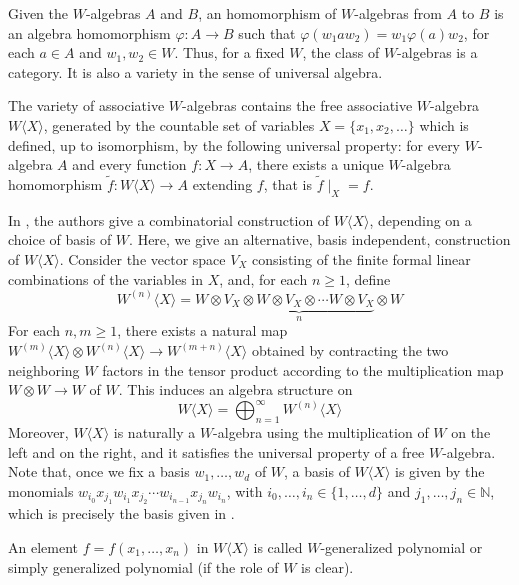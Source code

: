 \documentclass{article}
\newcommand{\WX}{W\langle X\rangle}
\begin{document}
Given the $W$-algebras $A$ and $B$, an homomorphism of $W$-algebras from $A$ to $B$ is an algebra homomorphism $\varphi:A\rightarrow B$ such that $\varphi(w_1aw_2)=w_1\varphi(a)w_2$, for each $a\in A$ and $w_1,w_2\in W$. Thus, for a fixed $W$, the class of $W$-algebras is a category. It is also a variety in the sense of universal algebra. 

The variety of associative $W$-algebras contains the free associative $W$-algebra $\WX$, generated by the countable set of variables $X=\{x_1,x_2,\dots\}$ which is defined, up to isomorphism, by the following universal property: for every $W$-algebra $A$ and every function $f:X\rightarrow A$, there exists a unique $W$-algebra homomorphism $\tilde{f}: \WX \rightarrow A$ extending $f$, that is $\tilde{f}\mid_X = f$.

In \cite{MR25a}, the authors give a combinatorial construction of $\WX$, depending on a choice of basis of $W$. Here, we give an alternative, basis independent, construction of $\WX$. Consider the vector space $V_X$ consisting of the finite formal linear combinations of the variables in $X$, and, for each $n\geq 1$, define \begin{equation}\label{eq: W^n}
	W^{(n)}\langle X\rangle = W\otimes \underbrace{V_X\otimes W \otimes V_X \otimes \cdots W \otimes V_X}_n \otimes W 
\end{equation}
For each $n,m\geq1$, there exists a natural map $W^{(m)}\langle X\rangle\otimes W^{(n)}\langle X\rangle \rightarrow W^{(m+n)}\langle X\rangle$ obtained by contracting the two neighboring $W$ factors in the tensor product according to the multiplication map $W\otimes W\rightarrow W$ of $W$. This induces an algebra structure on \begin{equation}\label{eq: WX}
	W\langle X\rangle = \bigoplus_{n=1}^\infty W^{(n)}\langle X\rangle
\end{equation}
Moreover, $W\langle X \rangle$ is naturally a $W$-algebra using the multiplication of $W$ on the left and on the right, and it satisfies the universal property of a free $W$-algebra. Note that, once we fix a basis $w_1,\dots,w_d$ of $W$, a basis of $W\langle X\rangle$ is given by the monomials $w_{i_0}x_{j_1}w_{i_1}x_{j_2}\cdots w_{i_{n-1}}x_{j_n}w_{i_n}$, with $i_0,\dots,i_n\in\{1,\dots,d\}$ and $j_1,\dots,j_n\in \mathbb{N}$, which is precisely the basis given in \cite{MR25a}.

An element $f=f(x_1,\ldots,x_n)$ in $W \langle X \rangle$ is called $W$-generalized polynomial or simply generalized polynomial (if the role of $W$ is clear).
\end{document}
